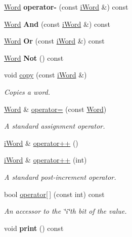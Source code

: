 \begin{DoxyCompactItemize}
\item 
\hypertarget{classWord_a9ec270f103a3a755bd7b627e4b899bb4}{
\hyperlink{classWord}{Word} {\bfseries operator-\/} (const \hyperlink{classiWord}{iWord} \&) const }
\label{classWord_a9ec270f103a3a755bd7b627e4b899bb4}

\item 
\hypertarget{classWord_a4e1926ab5f4af7b63ec1bf4fadf873ad}{
\hyperlink{classWord}{Word} {\bfseries And} (const \hyperlink{classiWord}{iWord} \&) const }
\label{classWord_a4e1926ab5f4af7b63ec1bf4fadf873ad}

\item 
\hypertarget{classWord_aa8645b9198fac6d0833b32503db6e18a}{
\hyperlink{classWord}{Word} {\bfseries Or} (const \hyperlink{classiWord}{iWord} \&) const }
\label{classWord_aa8645b9198fac6d0833b32503db6e18a}

\item 
\hypertarget{classWord_afdecfa9e3f2fda36496f249617a4cef5}{
\hyperlink{classWord}{Word} {\bfseries Not} () const }
\label{classWord_afdecfa9e3f2fda36496f249617a4cef5}

\item 
void \hyperlink{classWord_abb97142e332c7cc25d2a0c2bdb6c3d9b}{copy} (const \hyperlink{classiWord}{iWord} \&)
\begin{DoxyCompactList}\small\item\em Copies a word. \item\end{DoxyCompactList}\item 
\hyperlink{classWord}{Word} \& \hyperlink{classWord_a2ae41869cb0f1855fc18c6bce05f7c4d}{operator=} (const \hyperlink{classWord}{Word})
\begin{DoxyCompactList}\small\item\em A standard assignment operator. \item\end{DoxyCompactList}\item 
\hyperlink{classiWord}{iWord} \& \hyperlink{classWord_a3837f49bcb44597e6d738ccb0eeed144}{operator++} ()
\item 
\hyperlink{classiWord}{iWord} \& \hyperlink{classWord_ae921b75d263be790fd150c5962445163}{operator++} (int)
\begin{DoxyCompactList}\small\item\em A standard post-\/increment operator. \item\end{DoxyCompactList}\item 
bool \hyperlink{classWord_ab0f10ac1a0397559b859774b503538fe}{operator\mbox{[}$\,$\mbox{]}} (const int) const 
\begin{DoxyCompactList}\small\item\em An accessor to the \char`\"{}i\char`\"{}th bit of the value. \item\end{DoxyCompactList}\item 
\hypertarget{classWord_a7484e0f4d1fa712ca367539dad71dfa3}{
void {\bfseries print} () const }
\label{classWord_a7484e0f4d1fa712ca367539dad71dfa3}

\end{DoxyCompactItemize}
